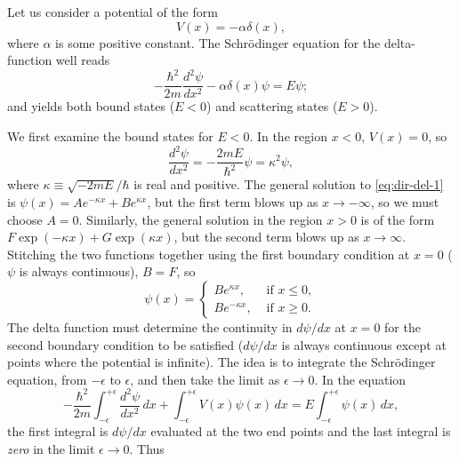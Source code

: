 \documentclass{article}
\begin{document}
Let us consider a potential of the form
\begin{equation} \label{eq:dir-del}
  V(x) = -\alpha\delta(x),
\end{equation}
where $\alpha$ is some positive constant. The Schr\"{o}dinger equation for the
delta-function well reads
\begin{equation} \label{eq:dir-del-1}
  -\frac{\hbar^2}{2m}\frac{d^2\psi}{dx^2} - \alpha\delta(x)\psi = E\psi;
\end{equation}
and yields both bound states ($E < 0$) and scattering states ($E > 0$).

We first examine the bound states for $E < 0$. In the region $x < 0$, $V(x) =
0$, so
\begin{equation} \label{eq:dir-del-bou-1}
  \frac{d^2\psi}{dx^2} = -\frac{2mE}{\hbar^2}\psi = \kappa^2\psi,
\end{equation}
where $\kappa \equiv \sqrt{-2mE}/\hbar$ is real and positive. The general
solution to \eqref{eq:dir-del-1} is $\psi(x) = Ae^{-\kappa x} + Be^{\kappa x}$,
but the first term blows up as $x \to -\infty$, so we must choose $A = 0$.
Similarly, the general solution in the region $x > 0$ is of the form
$F\exp(-\kappa x) + G\exp(\kappa x)$, but the second term blows up as $x \to
\infty$. Stitching the two functions together using the first boundary
condition at $x = 0$ ($\psi$ is always continuous), $B = F$, so
\begin{equation} \label{eq:dir-del-bou-2}
  \psi(x) =
  \begin{cases}
    Be^{\kappa x}, &\text{ if } x \leq 0, \\
    Be^{-\kappa x}, &\text{ if } x \geq 0.
  \end{cases}
\end{equation}
The delta function must determine the continuity in $d\psi/dx$ at $x = 0$ for
the second boundary condition to be satisfied ($d\psi/dx$ is always continuous
except at points where the potential is infinite). The idea is to integrate the
Schr\"{o}dinger equation, from $-\epsilon$ to $\epsilon$, and then take the
limit as $\epsilon \to 0$. In the equation
\begin{equation} \label{eq:dir-del-bou-3}
  -\frac{\hbar^2}{2m}\int_{-\epsilon}^{+\epsilon} \frac{d^2\psi}{dx^2} \,dx
  + \int_{-\epsilon}^{+\epsilon} V(x)\psi(x) \,dx
  = E\int_{-\epsilon}^{+\epsilon} \psi(x) \,dx,
\end{equation}
the first integral is $d\psi/dx$ evaluated at the two end points and the last
integral is \emph{zero} in the limit $\epsilon \to 0$. Thus
\end{document}
